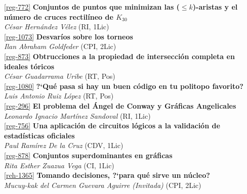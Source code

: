\begin{multicols}{2}
\raggedcolumns

\noindent  \ref{reg-772}  {\bfseries Conjuntos de puntos que minimizan las ($\leq\!k$)-aristas y el n\'umero de cruces rectil\'ineo de $K_{30}$}\\
{\slshape  C\'esar  Hern\'andez V\'elez} {\footnotesize (RI, 1Lic)}\\

\noindent  \ref{reg-1073}  {\bfseries Desvar\'ios sobre los torneos}\\
{\slshape  Ilan Abraham Goldfeder} {\footnotesize (CPI, 2Lic)}\\

\noindent  \ref{reg-873}  {\bfseries Obtrucciones a la propiedad de intersecci\'on completa en ideales t\'oricos}\\
{\slshape  C\'esar  Guadarrama Uribe} {\footnotesize (RT, Pos)}\\

\noindent  \ref{reg-1080}  {\bfseries ?`Qu\'e pasa si hay un buen c\'odigo en tu politopo favorito?}\\
{\slshape  Luis Antonio Ruiz L\'opez} {\footnotesize (RT, Pos)}\\

\noindent  \ref{reg-296}  {\bfseries El problema del \'Angel de Conway y Gr\'aficas Angelicales}\\
{\slshape  Leonardo Ignacio Mart\'inez Sandoval} {\footnotesize (RI, 1Lic)}\\

\noindent  \ref{reg-756}  {\bfseries Una aplicaci\'on de circuitos l\'ogicos a la validaci\'on de estad\'isticas oficiales}\\
{\slshape  Paul  Ram\'irez De la Cruz} {\footnotesize (CDV, 1Lic)}\\

\noindent  \ref{reg-878}  {\bfseries Conjuntos superdominantes en gr\'aficas}\\
{\slshape  Rita Esther Zuazua Vega} {\footnotesize (CI, 1Lic)}\\

\noindent  \ref{reh-1365}  {\bfseries Tomando decisiones, ?`para qu\'e sirve un n\'ucleo?}\\
{\slshape  Mucuy-kak del Carmen Guevara Aguirre (Invitada)} {\footnotesize (CPI, 2Lic)}\\


\end{multicols}
